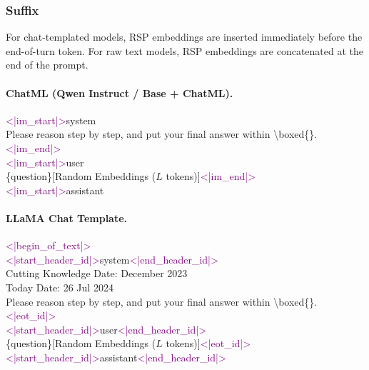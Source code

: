 \subsubsection{Suffix}

For chat-templated models, RSP embeddings are inserted immediately before the end-of-turn token. For raw text models, RSP embeddings are concatenated at the end of the prompt.

\paragraph{ChatML (Qwen Instruct / Base + ChatML).}
\begin{tcolorbox}[colback=gray!5, colframe=black!60, arc=3pt, boxrule=0.5pt, fontupper=\footnotesize\ttfamily, breakable]
\textcolor{purple}{<|im\_start|>}system\\
Please reason step by step, and put your final answer within \textbackslash boxed\{\}.\textcolor{purple}{<|im\_end|>}\\
\textcolor{purple}{<|im\_start|>}user\\
\{question\}\textcolor{blue!70!black}{[Random Embeddings ($L$ tokens)]}\textcolor{purple}{<|im\_end|>}\\
\textcolor{purple}{<|im\_start|>}assistant
\end{tcolorbox}

\paragraph{LLaMA Chat Template.}
\begin{tcolorbox}[colback=gray!5, colframe=black!60, arc=3pt, boxrule=0.5pt, fontupper=\footnotesize\ttfamily, breakable]
\textcolor{purple}{<|begin\_of\_text|>}\\
\textcolor{purple}{<|start\_header\_id|>}system\textcolor{purple}{<|end\_header\_id|>}\\
Cutting Knowledge Date: December 2023\\
Today Date: 26 Jul 2024\\
Please reason step by step, and put your final answer within \textbackslash boxed\{\}.\textcolor{purple}{<|eot\_id|>}\\
\textcolor{purple}{<|start\_header\_id|>}user\textcolor{purple}{<|end\_header\_id|>}\\
\{question\}\textcolor{blue!70!black}{[Random Embeddings ($L$ tokens)]}\textcolor{purple}{<|eot\_id|>}\\
\textcolor{purple}{<|start\_header\_id|>}assistant\textcolor{purple}{<|end\_header\_id|>}
\end{tcolorbox}

